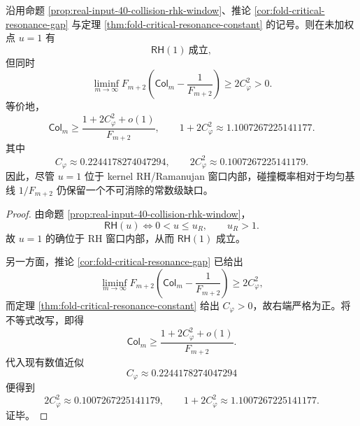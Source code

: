 \begin{theorem}[RH 窗口与常数级均匀性缺口严格共存]\label{thm:xi-time-part9pb-rh-window-uniform-gap-coexistence}
沿用命题 \ref{prop:real-input-40-collision-rhk-window}、推论
\ref{cor:fold-critical-resonance-gap} 与定理 \ref{thm:fold-critical-resonance-constant} 的记号。则在未加权点 \(u=1\) 有
\[
\textsf{RH}(1)\ \text{成立},
\]
但同时
\[
\boxed{\ 
\liminf_{m\to\infty}
F_{m+2}\left(\mathsf{Col}_m-\frac{1}{F_{m+2}}\right)
\ge
2C_\varphi^2
>0.\ }
\]
等价地，
\[
\boxed{\ 
\mathsf{Col}_m
\ge
\frac{1+2C_\varphi^2+o(1)}{F_{m+2}},
\qquad
1+2C_\varphi^2\approx 1.1007267225141177.\ }
\]
其中
\[
C_\varphi\approx 0.2244178274047294,
\qquad
2C_\varphi^2\approx 0.1007267225141179.
\]
因此，尽管 \(u=1\) 位于 kernel RH/Ramanujan 窗口内部，碰撞概率相对于均匀基线 \(1/F_{m+2}\) 仍保留一个不可消除的常数级缺口。
\end{theorem}
\begin{proof}
由命题 \ref{prop:real-input-40-collision-rhk-window}，
\[
\textsf{RH}(u)\Longleftrightarrow 0<u\le u_R,
\qquad
u_R>1.
\]
故 \(u=1\) 的确位于 RH 窗口内部，从而 \(\textsf{RH}(1)\) 成立。

另一方面，推论 \ref{cor:fold-critical-resonance-gap} 已给出
\[
\liminf_{m\to\infty}
F_{m+2}\left(\mathsf{Col}_m-\frac{1}{F_{m+2}}\right)
\ge
2C_\varphi^2,
\]
而定理 \ref{thm:fold-critical-resonance-constant} 给出 \(C_\varphi>0\)，故右端严格为正。将不等式改写，即得
\[
\mathsf{Col}_m
\ge
\frac{1+2C_\varphi^2+o(1)}{F_{m+2}}.
\]
代入现有数值近似
\[
C_\varphi\approx 0.2244178274047294
\]
便得到
\[
2C_\varphi^2\approx 0.1007267225141179,
\qquad
1+2C_\varphi^2\approx 1.1007267225141177.
\]
证毕。
\end{proof}


